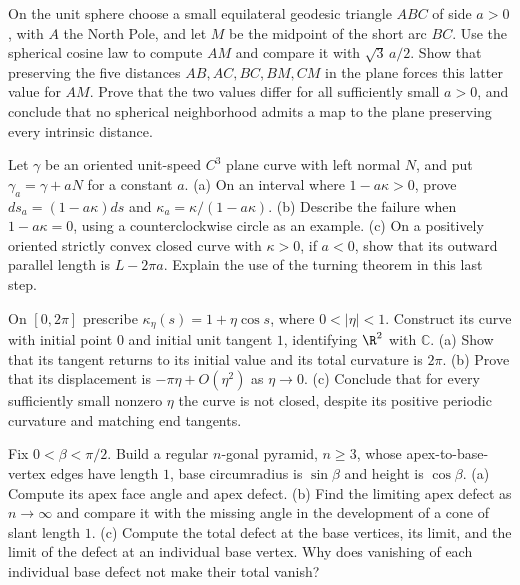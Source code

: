 \begin{exercise}[$\star\star$]\label{geometry:ex:nomap}
On the unit sphere choose a small equilateral geodesic triangle $ABC$ of side $a>0$, with $A$ the North Pole, and let $M$ be the midpoint of the short arc $BC$. Use the spherical cosine law to compute $AM$ and compare it with $\sqrt3\,a/2$. Show that preserving the five distances $AB,AC,BC,BM,CM$ in the plane forces this latter value for $AM$. Prove that the two values differ for all sufficiently small $a>0$, and conclude that no spherical neighborhood admits a map to the plane preserving every intrinsic distance.
\end{exercise}

\begin{exercise}[$\star\star$]\label{ex:v9-app-k-offset-curvature}
Let $\gamma$ be an oriented unit-speed $C^3$ plane curve with left normal $N$, and put $\gamma_a=\gamma+aN$ for a constant $a$.
(a) On an interval where $1-a\kappa>0$, prove $ds_a=(1-a\kappa)ds$ and $\kappa_a=\kappa/(1-a\kappa)$.
(b) Describe the failure when $1-a\kappa=0$, using a counterclockwise circle as an example.
(c) On a positively oriented strictly convex closed curve with $\kappa>0$, if $a<0$, show that its outward parallel length is $L-2\pi a$. Explain the use of the turning theorem in this last step.
\end{exercise}

\begin{exercise}[$\star\star$]\label{ex:v9-app-k-turning-not-closure}
On $[0,2\pi]$ prescribe $\kappa_\eta(s)=1+\eta\cos s$, where $0<|\eta|<1$. Construct its curve with initial point $0$ and initial unit tangent $1$, identifying $\R^2$ with $\mathbb C$.
(a) Show that its tangent returns to its initial value and its total curvature is $2\pi$.
(b) Prove that its displacement is $-\pi\eta+O(\eta^2)$ as $\eta\to0$.
(c) Conclude that for every sufficiently small nonzero $\eta$ the curve is not closed, despite its positive periodic curvature and matching end tangents.
\end{exercise}

\begin{exercise}[$\star\star$]\label{ex:v9-app-k-pyramid-limit}
Fix $0<\beta<\pi/2$. Build a regular $n$-gonal pyramid, $n\ge3$, whose apex-to-base-vertex edges have length $1$, base circumradius is $\sin\beta$ and height is $\cos\beta$.
(a) Compute its apex face angle and apex defect.
(b) Find the limiting apex defect as $n\to\infty$ and compare it with the missing angle in the development of a cone of slant length $1$.
(c) Compute the total defect at the base vertices, its limit, and the limit of the defect at an individual base vertex. Why does vanishing of each individual base defect not make their total vanish?
\end{exercise}

